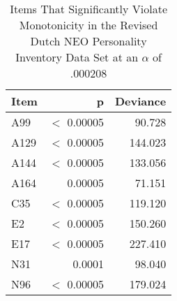 \begin{table}[ht]
\centering
\caption{Items That Significantly Violate Monotonicity in the Revised Dutch NEO Personality Inventory Data Set at an $\alpha$ of .000208} 
\label{tab:neo_pi_r_dolan2}
\begin{tabular}{lrr}
  \toprule
Item & p & Deviance \\ 
  \midrule
A99 & $<$ 0.00005 & 90.728 \\ 
  A129 & $<$ 0.00005 & 144.023 \\ 
  A144 & $<$ 0.00005 & 133.056 \\ 
  A164 & 0.00005 & 71.151 \\ 
  C35 & $<$ 0.00005 & 119.120 \\ 
  E2 & $<$ 0.00005 & 150.260 \\ 
  E17 & $<$ 0.00005 & 227.410 \\ 
  N31 & 0.0001 & 98.040 \\ 
  N96 & $<$ 0.00005 & 179.024 \\ 
   \bottomrule
\end{tabular}
\end{table}
